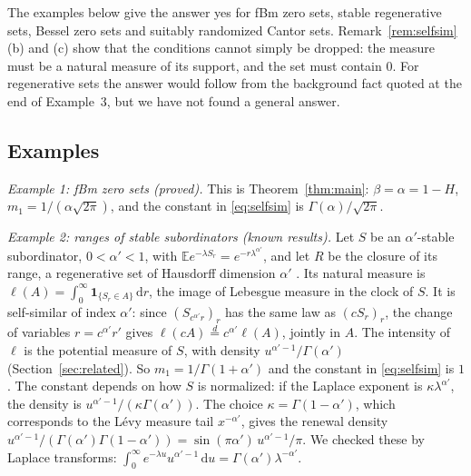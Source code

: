\documentclass[11pt]{article}
\theoremstyle{remark}
\theoremstyle{definition}
\newcommand{\E}{\mathbb{E}}
\newcommand{\dd}{\,\mathrm{d}}
\begin{document}
The examples below give the answer yes for fBm zero sets, stable regenerative sets, Bessel zero sets and suitably randomized Cantor sets. Remark~\ref{rem:selfsim}(b) and (c) show that the conditions cannot simply be dropped: the measure must be a natural measure of its support, and the set must contain $0$. For regenerative sets the answer would follow from the background fact quoted at the end of Example~3, but we have not found a general answer.

\subsection{Examples}
\emph{Example 1: fBm zero sets (proved).} This is Theorem~\ref{thm:main}: $\beta=\alpha=1-H$, $m_1=1/(\alpha\sqrt{2\pi})$, and the constant in \eqref{eq:selfsim} is $\Gamma(\alpha)/\sqrt{2\pi}$.

\emph{Example 2: ranges of stable subordinators (known results).} Let $S$ be an $\alpha'$-stable subordinator, $0<\alpha'<1$, with $\E e^{-\lambda S_r}=e^{-r\lambda^{\alpha'}}$, and let $R$ be the closure of its range, a regenerative set of Hausdorff dimension $\alpha'$ \cite{Ber99}. Its natural measure is $\ell(A)=\int_0^\infty\mathbf 1_{\{S_r\in A\}}\dd r$, the image of Lebesgue measure in the clock of $S$. It is self-similar of index $\alpha'$: since $(S_{c^{\alpha'}r})_r$ has the same law as $(cS_r)_r$, the change of variables $r=c^{\alpha'}r'$ gives $\ell(cA)\overset{d}{=}c^{\alpha'}\ell(A)$, jointly in $A$. The intensity of $\ell$ is the potential measure of $S$, with density $u^{\alpha'-1}/\Gamma(\alpha')$ (Section~\ref{sec:related}). So $m_1=1/\Gamma(1+\alpha')$ and the constant in \eqref{eq:selfsim} is $1$. The constant depends on how $S$ is normalized: if the Laplace exponent is $\kappa\lambda^{\alpha'}$, the density is $u^{\alpha'-1}/(\kappa\Gamma(\alpha'))$. The choice $\kappa=\Gamma(1-\alpha')$, which corresponds to the Lévy measure tail $x^{-\alpha'}$, gives the renewal density $u^{\alpha'-1}/(\Gamma(\alpha')\Gamma(1-\alpha'))=\sin(\pi\alpha')\,u^{\alpha'-1}/\pi$. We checked these by Laplace transforms: $\int_0^\infty e^{-\lambda u}u^{\alpha'-1}\dd u=\Gamma(\alpha')\lambda^{-\alpha'}$.
\end{document}
